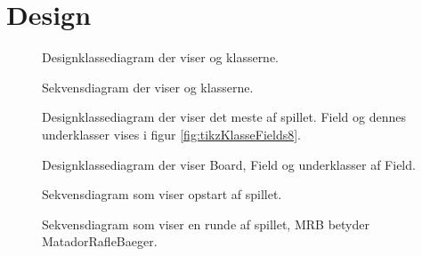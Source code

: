 \chapter{Design}\label{chap:design}

\begin{figure}
\caption{Designklassediagram der viser  og  klasserne.}\label{fig:tikzKlasseKontoPlayer17}
\centering

\end{figure}

\begin{figure}
\caption{Sekvensdiagram der viser  og  klasserne.}\label{fig:tikzSekvensKontoPlayer17}
\centering

\end{figure}
\begin{figure}
\caption{Designklassediagram der viser det meste af spillet. Field og dennes underklasser vises i figur \vref{fig:tikzKlasseFields8}.}\label{fig:tikzKlasseMinusFields8}
\centering

\end{figure}

\begin{figure}
\caption{Designklassediagram der viser Board, Field og underklasser af Field.}\label{fig:tikzKlasseFields8}
\centering

\end{figure}

\begin{figure}
\caption{Sekvensdiagram som viser opstart af spillet.}\label{fig:tikzSekvensStartGame8}
\centering

\end{figure}

\begin{figure}
\centering
\caption{Sekvensdiagram som viser en runde af spillet, MRB betyder MatadorRafleBaeger.}\label{fig:tikzSekvensGame8}
\end{figure}